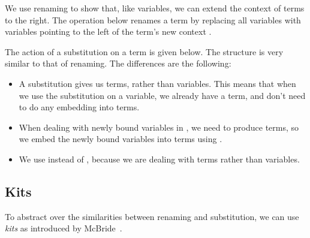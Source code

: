 \bindRen{}
\rename{}

We use renaming to show that, like variables, we can extend the context of terms
to the right.
The operation below renames a term by replacing all variables with variables
pointing to the left of the term's new context \GD{}.

\leftTerm{}

The action of a substitution on a term is given below.
The structure is very similar to that of renaming.
The differences are the following:

\begin{itemize}
  \item A substitution gives us terms, rather than variables.
        This means that when we use the substitution on a variable, we already
        have a term, and don't need to do any embedding into terms.
  \item When dealing with newly bound variables in , we
        need to produce terms, so we embed the newly bound variables into terms
        using .
  \item We use  instead of
        , because we are dealing with terms rather
        than variables.
\end{itemize}

\bindSub{}
\substitute{}

\subsection{Kits}

To abstract over the similarities between renaming and substitution, we can use
\emph{kits} as introduced by McBride~\cite{McBride05,BHKM12}.
